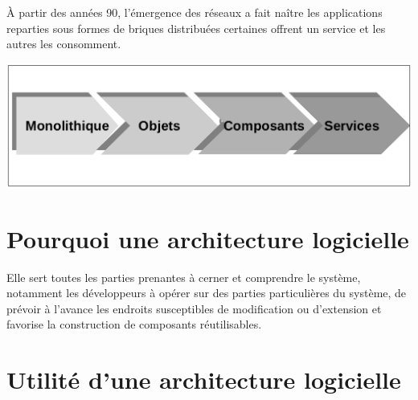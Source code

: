 \documentclass[12pt, a4paper, openany]{report}
\begin{document}
 À partir des années 90, l’émergence des réseaux a fait naître les applications reparties sous formes de briques distribuées certaines offrent un service et les autres les consomment.

   \begin{center}
     \includegraphics[scale=0.35]{evolution_archi_7.png}
     \label{fig7}
   \end{center}
   
 \section{Pourquoi une architecture logicielle}
 Elle sert toutes les parties prenantes à cerner et comprendre le système, notamment les  développeurs à opérer sur des parties particulières du système, de prévoir à l’avance les endroits susceptibles de modification ou d’extension et favorise la construction de composants réutilisables.
 
 \section{Utilité d’une architecture logicielle} \cite{refbib3}
 
\end{document}
